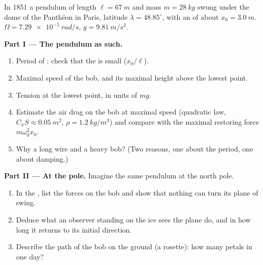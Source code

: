 \begin{problem}
\label{pb:b1:non-inertial-frames:1}
In 1851 a pendulum of length $\ell = \qty{67}{m}$ and mass $m = \qty{28}{kg}$
swung under the dome of the Panthéon in Paris, latitude $\lambda =
48.85^\circ$, with an  of about $x_0 = \qty{3.0}{m}$. $\Omega =
\qty{7.29e-5}{rad/s}$, $g = \qty{9.81}{m/s^2}$.

\medskip
\noindent\textbf{Part I --- The pendulum as such.}
\begin{enumerate}
  \item Period of ; check that the  is small
        ($x_0/\ell$).
  \item Maximal speed of the bob, and its maximal height above the
        lowest point.
  \item Tension at the lowest point, in units of $mg$.
  \item Estimate the air drag on the bob at maximal speed (quadratic
        law, $C_xS \approx \qty{0.05}{m^2}$, $\rho = \qty{1.2}{kg/m^3}$) and
        compare with the maximal restoring force $m\omega_0^2x_0$.
  \item Why a long wire and a heavy bob? (Two reasons, one about the
        period, one about damping.)
\end{enumerate}

\medskip
\noindent\textbf{Part II --- At the pole.}
Imagine the same pendulum at the north pole.
\begin{enumerate}[resume]
  \item In the , list the forces on the bob and show
        that nothing can turn its plane of swing.
  \item Deduce what an observer standing on the ice sees the plane do,
        and in how long it returns to its initial direction.
  \item Describe the path of the bob on the ground (a rosette): how many
        petals in one day?
\end{enumerate}


\end{problem}

